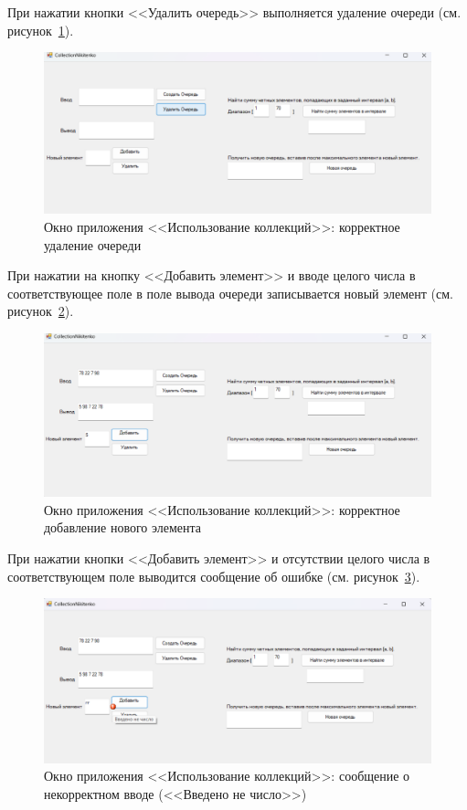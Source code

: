 \documentclass[bachelor, och, pract, times]{SCWorks}
\begin{document}
При нажатии кнопки <<Удалить очередь>> выполняется удаление очереди (см. рисунок~\ref{fig:queue-04}).

\begin{figure}[H]
    \centering
    \includegraphics[scale=0.5]{Скрины/Снимок экрана 2025-01-05 212248.png}
    \caption{Окно приложения <<Использование коллекций>>: корректное удаление очереди}\label{fig:queue-04}
\end{figure}

При нажатии на кнопку <<Добавить элемент>> и вводе целого числа в соответствующее поле в поле вывода очереди записывается новый элемент (см. рисунок~\ref{fig:queue-05}).

\begin{figure}[H]
    \centering
    \includegraphics[scale=0.5]{Скрины/Снимок экрана 2025-01-05 212325.png}
    \caption{Окно приложения <<Использование коллекций>>: корректное добавление нового элемента}\label{fig:queue-05}
\end{figure}

При нажатии кнопки <<Добавить элемент>> и отсутствии целого числа в соответствующем поле выводится сообщение об ошибке (см. рисунок~\ref{fig:queue-06}).

\begin{figure}[H]
    \centering
    \includegraphics[scale=0.5]{Скрины/Снимок экрана 2025-01-05 212418.png}
    \caption{Окно приложения <<Использование коллекций>>: сообщение о некорректном вводе (<<Введено не число>>)}\label{fig:queue-06}
\end{figure}
\end{document}
